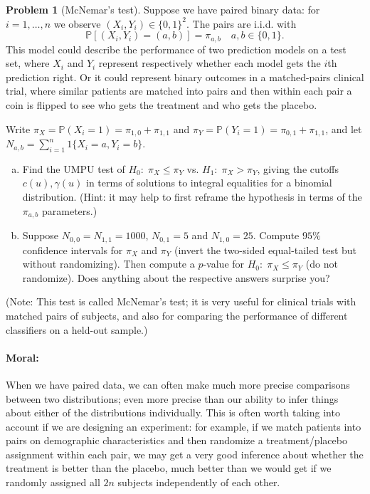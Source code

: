 \documentclass{article}
\newcommand{\PP}{\mathbb{P}}
\theoremstyle{definition}
\newtheorem{problem}{Problem}
\begin{document}
\begin{problem}[McNemar's test]
\label{prob:mcnemar-test}
Suppose we have paired binary data: for $i=1,\ldots,n$ we observe $(X_i,Y_i)\in \{0,1\}^2$. The pairs are i.i.d. with
\[
\PP\left[(X_i,Y_i) = (a,b)\right] = \pi_{a,b} \quad a,b\in \{0,1\}.
\]
This model could describe the performance of two prediction models on a test set, where $X_i$ and $Y_i$ represent respectively whether each model gets the $i$th prediction right. Or it could represent binary outcomes in a matched-pairs clinical trial, where similar patients are matched into pairs and then within each pair a coin is flipped to see who gets the treatment and who gets the placebo.

Write $\pi_X = \PP(X_i=1) = \pi_{1,0}+\pi_{1,1}$ and $\pi_Y = \PP(Y_i=1) = \pi_{0,1}+\pi_{1,1}$, and let $N_{a,b} = \sum_{i=1}^n 1\{X_i=a,Y_i=b\}$.

\begin{enumerate}[(a)]
\item Find the UMPU test of $H_0:\; \pi_X \leq \pi_Y$ vs. $H_1:\; \pi_X > \pi_Y$, giving the cutoffs $c(u), \gamma(u)$ in terms of solutions to integral equalities for a binomial distribution. (Hint: it may help to first reframe the hypothesis in terms of the $\pi_{a,b}$ parameters.)



\item Suppose $N_{0,0} = N_{1,1} = 1000$, $N_{0,1} = 5$ and $N_{1,0}=25$. Compute $95\%$ confidence intervals for $\pi_X$ and $\pi_Y$ (invert the two-sided equal-tailed test but without randomizing). Then compute a $p$-value for $H_0:\; \pi_X\leq\pi_Y$ (do not randomize). Does anything about the respective answers surprise you?



\end{enumerate}

(Note: This test is called McNemar's test; it is very useful for clinical trials with matched pairs of subjects, and also for comparing the performance of different classifiers on a held-out sample.)

\paragraph{Moral:} When we have paired data, we can often make much more precise comparisons between two distributions; even more precise than our ability to infer things about either of the distributions individually. This is often worth taking into account if we are designing an experiment: for example, if we match patients into pairs on demographic characteristics and then randomize a treatment/placebo assignment within each pair, we may get a very good inference about whether the treatment is better than the placebo, much better than we would get if we randomly assigned all $2n$ subjects independently of each other.
\end{problem}
\end{document}

